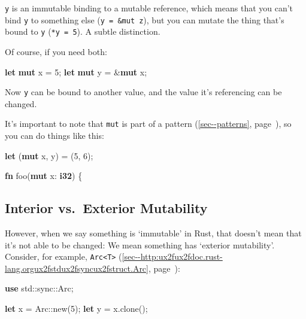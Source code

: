 \documentclass[a4paper,]{book}
\renewcommand*{\hyperref}[2][\ar]{%
  \def\ar{#2}%
  #2 (\autoref{#1}, page~\pageref{#1})}
\newenvironment{Shaded}{\begin{snugshade}}{\end{snugshade}}
\newcommand{\KeywordTok}[1]{\textcolor[rgb]{0.13,0.29,0.53}{\textbf{{#1}}}}
\newcommand{\DecValTok}[1]{\textcolor[rgb]{0.00,0.00,0.81}{{#1}}}
\newcommand{\NormalTok}[1]{{#1}}
\begin{document}
\texttt{y} is an immutable binding to a mutable reference, which means
that you can't bind \texttt{y} to something else
(\texttt{y\ =\ \&mut\ z}), but you can mutate the thing that's bound to
\texttt{y} (\texttt{*y\ =\ 5}). A subtle distinction.

Of course, if you need both:

\begin{Shaded}
\begin{Highlighting}[]
\KeywordTok{let} \KeywordTok{mut} \NormalTok{x = }\DecValTok{5}\NormalTok{;}
\KeywordTok{let} \KeywordTok{mut} \NormalTok{y = &}\KeywordTok{mut} \NormalTok{x;}
\end{Highlighting}
\end{Shaded}

Now \texttt{y} can be bound to another value, and the value it's
referencing can be changed.

It's important to note that \texttt{mut} is part of a
\hyperref[sec--patterns]{pattern}, so you can do things like this:

\begin{Shaded}
\begin{Highlighting}[]
\KeywordTok{let} \NormalTok{(}\KeywordTok{mut} \NormalTok{x, y) = (}\DecValTok{5}\NormalTok{, }\DecValTok{6}\NormalTok{);}

\KeywordTok{fn} \NormalTok{foo(}\KeywordTok{mut} \NormalTok{x: }\KeywordTok{i32}\NormalTok{) \{}
\end{Highlighting}
\end{Shaded}

\subsection{Interior vs.~Exterior
Mutability}\label{interior-vs.exterior-mutability}

However, when we say something is `immutable' in Rust, that doesn't mean
that it's not able to be changed: We mean something has `exterior
mutability'. Consider, for example,
\hyperref[sec--http:ux2fux2fdoc.rust-lang.orgux2fstdux2fsyncux2fstruct.Arc]{\texttt{Arc\textless{}T\textgreater{}}}:

\begin{Shaded}
\begin{Highlighting}[]
\KeywordTok{use} \NormalTok{std::sync::Arc;}

\KeywordTok{let} \NormalTok{x = Arc::new(}\DecValTok{5}\NormalTok{);}
\KeywordTok{let} \NormalTok{y = x.clone();}
\end{Highlighting}
\end{Shaded}
\end{document}
